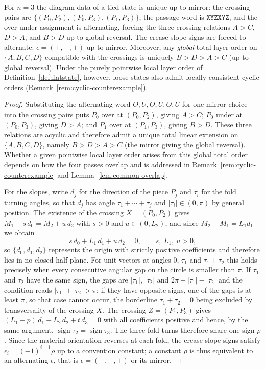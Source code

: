 \begin{corollary}\label{cor:tyingdata}
For $n=3$ the diagram data of a tied state is unique up to mirror: the crossing pairs are $\{(P_0,P_2),(P_0,P_3),(P_1,P_3)\}$, the passage word is $\mathtt{XYZXYZ}$, and the over-under assignment is alternating, forcing the three crossing relations $A>C$, $D>A$, and $B>D$ up to global reversal. The crease-slope signs are forced to alternate: $\epsilon=(+,-,+)$ up to mirror. Moreover, any \emph{global} total layer order on $\{A,B,C,D\}$ compatible with the crossings is uniquely $B>D>A>C$ (up to global reversal). Under the purely pointwise local layer order of Definition~\textup{\ref{def:flatstate}}, however, loose states also admit locally consistent cyclic orders \textup{(Remark~\ref{rem:cyclic-counterexample})}.
\end{corollary}

\begin{proof}
Substituting the alternating word $O,U,O,U,O,U$ for one mirror choice into the crossing pairs puts $P_0$ over at $(P_0,P_2)$, giving $A>C$; $P_0$ under at $(P_0,P_3)$, giving $D>A$; and $P_1$ over at $(P_1,P_3)$, giving $B>D$. These three relations are acyclic and therefore admit a unique total linear extension on $\{A,B,C,D\}$, namely $B>D>A>C$ (the mirror giving the global reversal). Whether a given pointwise local layer order arises from this global total order depends on how the four passes overlap and is addressed in Remark~\ref{rem:cyclic-counterexample} and Lemma~\ref{lem:common-overlap}.

For the slopes, write $d_j$ for the direction of the piece $P_j$ and $\tau_i$ for the fold turning angles, so that $d_j$ has angle $\tau_1+\cdots+\tau_j$ and $|\tau_i|\in(0,\pi)$ by general position. The existence of the crossing $X=(P_0,P_2)$ gives $M_1-s\,d_0=M_2+u\,d_2$ with $s>0$ and $u\in(0,L_2)$, and since $M_2-M_1=L_1d_1$ we obtain
\[
  s\,d_0+L_1\,d_1+u\,d_2=0,\qquad s,\ L_1,\ u>0,
\]
so $\{d_0,d_1,d_2\}$ represents the origin with strictly positive coefficients and therefore lies in no closed half-plane. For unit vectors at angles $0$, $\tau_1$ and $\tau_1+\tau_2$ this holds precisely when every consecutive angular gap on the circle is smaller than $\pi$. If $\tau_1$ and $\tau_2$ have the same sign, the gaps are $|\tau_1|$, $|\tau_2|$ and $2\pi-|\tau_1|-|\tau_2|$ and the condition reads $|\tau_1|+|\tau_2|>\pi$; if they have opposite signs, one of the gaps is at least $\pi$, so that case cannot occur, the borderline $\tau_1+\tau_2=0$ being excluded by transversality of the crossing $X$. The crossing $Z=(P_1,P_3)$ gives $(L_1-p)\,d_1+L_2\,d_2+t\,d_3=0$ with all coefficients positive and hence, by the same argument, $\operatorname{sign}\tau_2=\operatorname{sign}\tau_3$. The three fold turns therefore share one sign $\rho$. Since the material orientation reverses at each fold, the crease-slope signs satisfy $\epsilon_i=(-1)^{i-1}\rho$ up to a convention constant; a constant $\rho$ is thus equivalent to an alternating $\epsilon$, that is $\epsilon=(+,-,+)$ or its mirror.
\end{proof}

